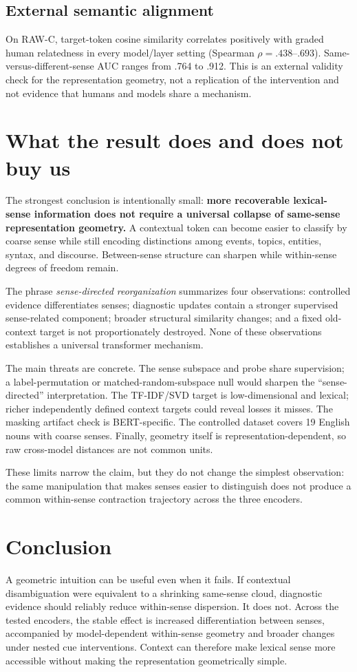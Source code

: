 \documentclass[10pt,twocolumn]{article}
\begin{document}
\subsection{External semantic alignment}
On RAW-C, target-token cosine similarity correlates positively with graded human relatedness in every model/layer setting (Spearman $\rho=.438$--$.693$). Same-versus-different-sense AUC ranges from .764 to .912. This is an external validity check for the representation geometry, not a replication of the intervention and not evidence that humans and models share a mechanism.

\section{What the result does and does not buy us}
The strongest conclusion is intentionally small: \textbf{more recoverable lexical-sense information does not require a universal collapse of same-sense representation geometry.} A contextual token can become easier to classify by coarse sense while still encoding distinctions among events, topics, entities, syntax, and discourse. Between-sense structure can sharpen while within-sense degrees of freedom remain.

The phrase \emph{sense-directed reorganization} summarizes four observations: controlled evidence differentiates senses; diagnostic updates contain a stronger supervised sense-related component; broader structural similarity changes; and a fixed old-context target is not proportionately destroyed. None of these observations establishes a universal transformer mechanism.

The main threats are concrete. The sense subspace and probe share supervision; a label-permutation or matched-random-subspace null would sharpen the ``sense-directed'' interpretation. The TF-IDF/SVD target is low-dimensional and lexical; richer independently defined context targets could reveal losses it misses. The masking artifact check is BERT-specific. The controlled dataset covers 19 English nouns with coarse senses. Finally, geometry itself is representation-dependent, so raw cross-model distances are not common units.

These limits narrow the claim, but they do not change the simplest observation: the same manipulation that makes senses easier to distinguish does not produce a common within-sense contraction trajectory across the three encoders.

\section{Conclusion}
A geometric intuition can be useful even when it fails. If contextual disambiguation were equivalent to a shrinking same-sense cloud, diagnostic evidence should reliably reduce within-sense dispersion. It does not. Across the tested encoders, the stable effect is increased differentiation between senses, accompanied by model-dependent within-sense geometry and broader changes under nested cue interventions. Context can therefore make lexical sense more accessible without making the representation geometrically simple.
\end{document}
